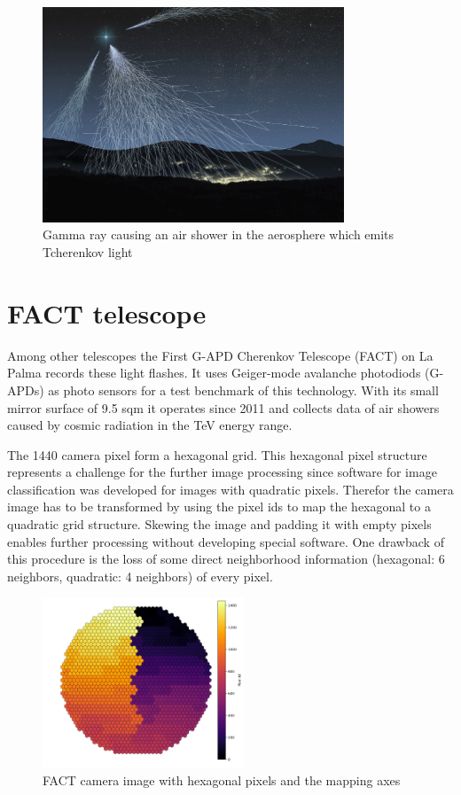 \begin{figure}
    \centering
    \includegraphics[width=9cm]{Plots/air_shower.jpg}
    \caption{Gamma ray causing an air shower in the aerosphere which emits Tcherenkov light}
    \label{fig:air_shower}
\end{figure}


\section{FACT telescope}
Among other telescopes the First G-APD Cherenkov Telescope (FACT) on La Palma records these light flashes.
It uses Geiger-mode avalanche photodiods (G-APDs) as photo sensors for a test benchmark of this technology.
With its small mirror surface of 9.5 sqm it operates since 2011
and collects data of air showers caused by cosmic radiation in the TeV energy range.

The 1440 camera pixel form a hexagonal grid.
This hexagonal pixel structure represents a challenge for the further image processing
since software for image classification was developed for images with quadratic pixels.
Therefor the camera image has to be transformed by using the pixel ids to map the hexagonal to a quadratic grid structure.
Skewing the image and padding it with empty pixels enables further processing without developing special software.
One drawback of this procedure is the loss of some direct neighborhood information
(hexagonal: 6 neighbors, quadratic: 4 neighbors) of every pixel.

\begin{figure}
    \centering
    \includegraphics[width=6cm]{Plots/FACT_Image.png}
    \caption{FACT camera image with hexagonal pixels and the mapping axes}
    \label{fig:fact_image}
\end{figure}

